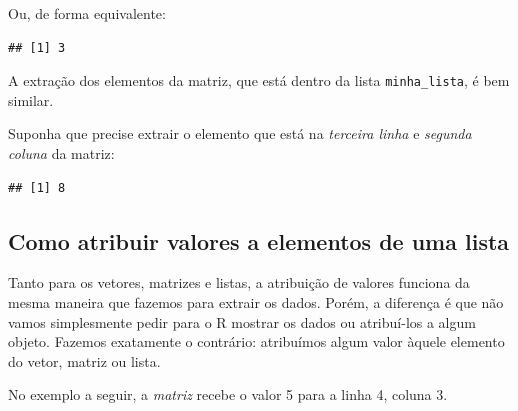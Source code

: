\documentclass[
]{book}
\newenvironment{Shaded}{\begin{snugshade}}{\end{snugshade}}
\newcommand{\DecValTok}[1]{\textcolor[rgb]{0.00,0.00,0.81}{#1}}
\newcommand{\NormalTok}[1]{#1}
\newcommand{\OperatorTok}[1]{\textcolor[rgb]{0.81,0.36,0.00}{\textbf{#1}}}
\newcommand{\StringTok}[1]{\textcolor[rgb]{0.31,0.60,0.02}{#1}}
\begin{document}
Ou, de forma equivalente:

\begin{Shaded}
\end{Shaded}

\begin{verbatim}
## [1] 3
\end{verbatim}

A extração dos elementos da matriz, que está dentro da lista
\texttt{minha\_lista}, é bem similar.

Suponha que precise extrair o elemento que está na \emph{terceira linha}
e \emph{segunda coluna} da matriz:

\begin{Shaded}
\end{Shaded}

\begin{verbatim}
## [1] 8
\end{verbatim}

\hypertarget{como-atribuir-valores-a-elementos-de-uma-lista}{%
\subsection{Como atribuir valores a elementos de uma
lista}\label{como-atribuir-valores-a-elementos-de-uma-lista}}

Tanto para os vetores, matrizes e listas, a atribuição de valores
funciona da mesma maneira que fazemos para extrair os dados. Porém, a
diferença é que não vamos simplesmente pedir para o R mostrar os dados
ou atribuí-los a algum objeto. Fazemos exatamente o contrário:
atribuímos algum valor àquele elemento do vetor, matriz ou lista.

No exemplo a seguir, a \emph{matriz} recebe o valor 5 para a linha 4,
coluna 3.

\begin{Shaded}
\end{Shaded}
\end{document}

